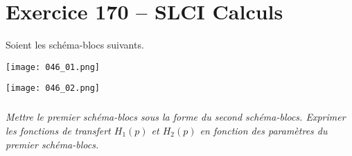 \section*{Exercice 170 -- SLCI Calculs}

\setcounter{exo}{0}


Soient les schéma-blocs suivants. 
\begin{center}
\texttt{[image: 046\_01.png]}
\end{center}



\begin{center}
\texttt{[image: 046\_02.png]}
\end{center}



\subparagraph{}\textit{Mettre le premier schéma-blocs sous la forme du second schéma-blocs. Exprimer les fonctions de transfert $H_1(p)$ et $H_2(p)$ en fonction des paramètres du premier schéma-blocs.}
\ifprof
\begin{corrige}
\end{corrige}
\else
\fi